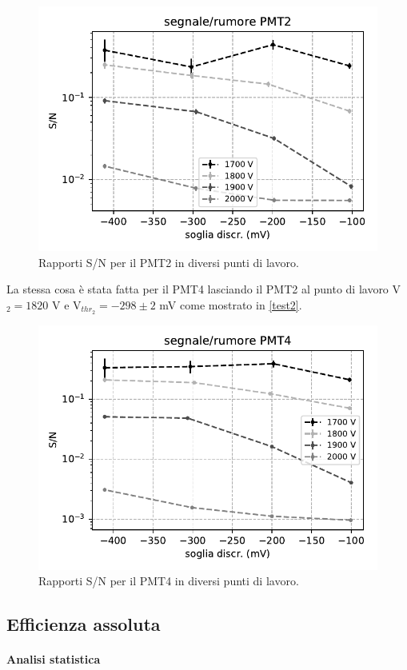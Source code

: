\documentclass[a4paper]{article}
\begin{document}
\begin{figure}[h]
\centering
\includegraphics[width=8 cm]{calib_pmt2}
\caption{Rapporti S/N per il PMT2 in diversi punti di lavoro.}
\label{test1}
\end{figure}

La stessa cosa è stata fatta per il PMT4 lasciando il PMT2 al punto di lavoro V$_2=1820$\! V e V$_{thr_2}=-298\pm2$\! mV come mostrato in \autoref{test2}.

\begin{figure}[h]
\centering
\includegraphics[width=8 cm]{calib_pmt4}
\caption{Rapporti S/N per il PMT4 in diversi punti di lavoro.}
\label{test2}
\end{figure}

\subsection*{Efficienza assoluta}

\paragraph{Analisi statistica}
\end{document}
